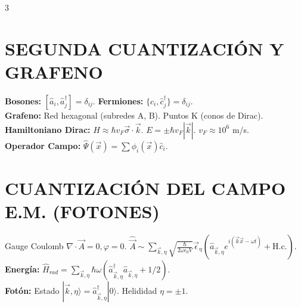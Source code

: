 \documentclass[8pt,a4paper,fleqn]{extarticle} %
\begin{document}
\begin{multicols}{3}
\section{SEGUNDA CUANTIZACIÓN Y GRAFENO}
\textbf{Bosones:} $[\hat{a}_i, \hat{a}_j^\dagger] = \delta_{ij}$. \textbf{Fermiones:} $\{\hat{c}_i, \hat{c}_j^\dagger\} = \delta_{ij}$.\\
\textbf{Grafeno:} Red hexagonal (subredes A, B). Puntos K (conos de Dirac).\\
\textbf{Hamiltoniano Dirac:} $H \approx \hbar v_F \vec{\sigma} \cdot \vec{k}$. $E = \pm \hbar v_F |\vec{k}|$. $v_F \approx 10^6$ m/s.\\
\textbf{Operador Campo:} $\hat{\Psi}(\vec{x}) = \sum \phi_i(\vec{x}) \hat{c}_i$.

\section{CUANTIZACIÓN DEL CAMPO E.M. (FOTONES)}
Gauge Coulomb $\nabla \cdot \vec{A} = 0, \varphi = 0$. $\hat{\vec{A}} \sim \sum_{\vec{k}, \eta} \sqrt{\frac{\hbar}{2\omega \epsilon_0 V}} \vec{\epsilon}_\eta (\hat{a}_{\vec{k},\eta} e^{i(\vec{k}\vec{x}-\omega t)} + \text{H.c.})$.\\
\textbf{Energía:} $\hat{H}_{rad} = \sum_{\vec{k}, \eta} \hbar \omega (\hat{a}_{\vec{k},\eta}^\dagger \hat{a}_{\vec{k},\eta} + 1/2)$.\\
\textbf{Fotón:} Estado $|\vec{k}, \eta\rangle = \hat{a}_{\vec{k},\eta}^\dagger |0\rangle$. Helididad $\eta = \pm 1$.


\end{multicols}
\end{document}
